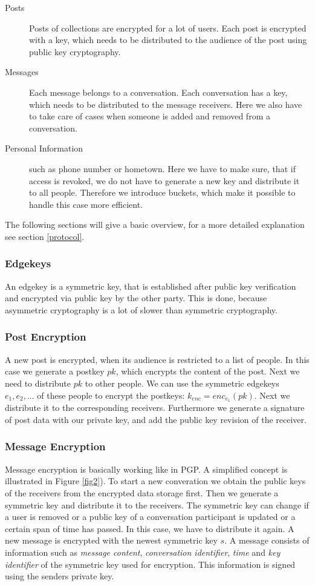 \documentclass{scrartcl}
\begin{document}
\begin{description}
  \item[Posts] Posts of collections are encrypted for a lot of users. Each post is encrypted with a key, which needs to be distributed to the audience of the post using public key cryptography.
  \item[Messages] Each message belongs to a conversation. Each conversation has a key, which needs to be distributed to the message receivers. Here we also have to take care of cases when someone is added and removed from a conversation.
  \item[Personal Information] such as phone number or hometown. Here we have to make sure, that if access is revoked, we do not have to generate a new key and distribute it to all people. Therefore we introduce buckets, which make it possible to handle this case more efficient.
\end{description}

The following sections will give a basic overview, for a more detailed explanation see section \ref{protocol}.
 \subsubsection{Edgekeys}
 An edgekey is a symmetric key, that is established after public key verification and encrypted via public key by the other party. This is done, because asymmetric cryptography is a lot of slower than symmetric cryptography.
 \subsubsection{Post Encryption}
A new post is encrypted, when its audience is restricted to a list of people. 
In this case we generate a postkey $pk$, which encrypts the content of the post. Next we need to distribute $pk$ to other people. We can use the symmetric edgekeys $e_1, e_2, ...$ of these people to encrypt the postkeys: $k_{enc} = enc_{e_1} (pk)$. Next we distribute it to the corresponding receivers. Furthermore we generate a signature of post data with our private key, and add the public key revision of the receiver.
 \subsubsection{Message Encryption}
 
  Message encryption is basically working like in PGP. A simplified concept is illustrated in Figure \ref{fig2}). 
To start a new converation we obtain the public keys of the receivers from the encrypted data storage first. Then we generate a symmetric key and distribute it to the receivers. The symmetric key can change if a user is removed or a public key of a conversation participant is updated or a certain span of time has passed. In this case, we have to distribute it again. A new message is encrypted with the newest symmetric key $s$.
A message consists of information such as \textit{message content}, \textit{conversation identifier}, \textit{time} and \textit{key identifier} of the symmetric key used for encryption. This information is  signed using the senders private key.
\end{document}
